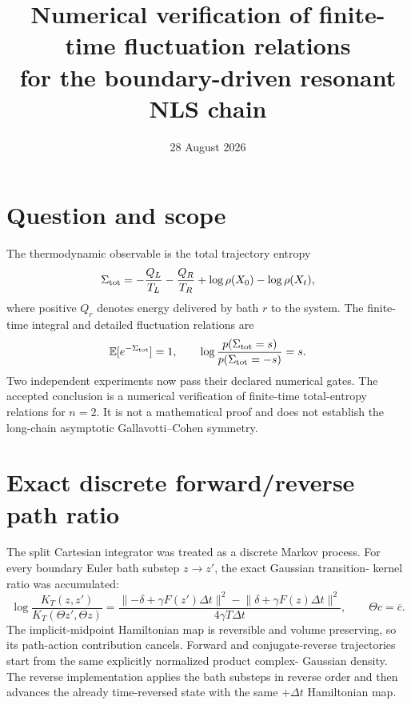 \documentclass[11pt]{article}
\title{Numerical verification of finite-time fluctuation relations\\
for the boundary-driven resonant NLS chain}
\author{}
\date{28 August 2026}
\newcommand{\E}{\mathbb E}
\newcommand{\dt}{\Delta t}
\begin{document}
\maketitle

\section*{Question and scope}

The thermodynamic observable is the total trajectory entropy
\begin{equation}
 \Sigma_{\rm tot}
 =-\frac{Q_L}{T_L}-\frac{Q_R}{T_R}
 +\log\rho(X_0)-\log\rho(X_t),
 \label{eq:total}
\end{equation}
where positive $Q_r$ denotes energy delivered by bath $r$ to the system.
The finite-time integral and detailed fluctuation relations are
\begin{equation}
 \E[e^{-\Sigma_{\rm tot}}]=1,
 \qquad
 \log\frac{p(\Sigma_{\rm tot}=s)}{p(\Sigma_{\rm tot}=-s)}=s.
 \label{eq:ft}
\end{equation}
Two independent experiments now pass their declared numerical gates.  The
accepted conclusion is a numerical verification of finite-time total-entropy
relations for $n=2$.  It is not a mathematical proof and does not establish
the long-chain asymptotic Gallavotti--Cohen symmetry.

\section{Exact discrete forward/reverse path ratio}

The split Cartesian integrator was treated as a discrete Markov process.  For
every boundary Euler bath substep $z\to z'$, the exact Gaussian transition-
kernel ratio was accumulated:
\begin{equation}
 \log\frac{K_T(z,z')}{K_T(\Theta z',\Theta z)}
 =\frac{\lVert-\delta+\gamma F(z')\dt\rVert^2
       -\lVert \delta+\gamma F(z )\dt\rVert^2}
       {4\gamma T\dt},
 \qquad \Theta c=\overline c.
 \label{eq:kernel}
\end{equation}
The implicit-midpoint Hamiltonian map is reversible and volume preserving, so
its path-action contribution cancels.  Forward and conjugate-reverse
trajectories start from the same explicitly normalized product complex-
Gaussian density.  The reverse implementation applies the bath substeps in
reverse order and then advances the already time-reversed state with the same
$+\dt$ Hamiltonian map.
\end{document}
